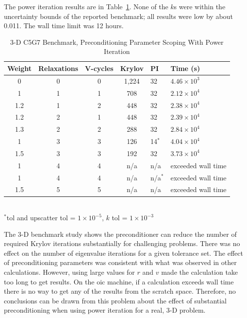 The power iteration results are in Table~\ref{table:3-D c5g7}. None of the $k$s were within the uncertainty bounds of the reported benchmark; all results were low by about 0.011. The wall time limit was 12 hours. 
%
\begin{table}[!h]
\caption{3-D C5G7 Benchmark, Preconditioning Parameter Scoping With Power Iteration}
\begin{center}
\begin{tabular}{c c c c l l}
\hline
Weight & Relaxations & V-cycles & Krylov & PI & Time (s) \\[0.5ex]
\hline
0    & 0 & 0 & 1,224 & 32 & $4.46 \times 10^{3}$ \\
1    & 1 & 1 & 708    & 32 & $2.12 \times 10^{4}$ \\
1.2 & 1 & 2 & 448    & 32 & $2.38 \times 10^{4}$ \\
1.2 & 2 & 1 & 448    & 32 & $2.39 \times 10^{4}$ \\
1.3 & 2 & 2 & 288    & 32 & $2.84 \times 10^{4}$ \\
1    & 3 & 3 & 126    & 14$^{*}$  & $4.04 \times 10^{4}$ \\
1.5 & 3 & 3 & 192    & 32 & $3.73 \times 10^{4}$ \\
1    & 4 & 4 & n/a     & n/a          & exceeded wall time \\
1    & 4 & 4 & n/a     & n/a$^{*}$ & exceeded wall time \\
1.5 & 5 & 5 & n/a     & n/a          & exceeded wall time \\
\hline 
\end{tabular}\\
$^{*}$tol and upscatter tol = $1 \times 10^{-5}$, $k$ tol = $1 \times 10^{-3}$
\end{center}
\label{table:3-D c5g7}
\end{table}

The 3-D benchmark study shows the preconditioner can reduce the number of required Krylov iterations substantially for challenging problems. There was no effect on the number of eigenvalue iterations for a given tolerance set. The effect of preconditioning parameters was consistent with what was observed in other calculations. However, using large values for $r$ and $v$ made the calculation take too long to get results. On the oic machine, if a calculation exceeds wall time there is no way to get any of the results from the scratch space. Therefore, no conclusions can be drawn from this problem about the effect of substantial preconditioning when using power iteration for a real, 3-D problem. 

